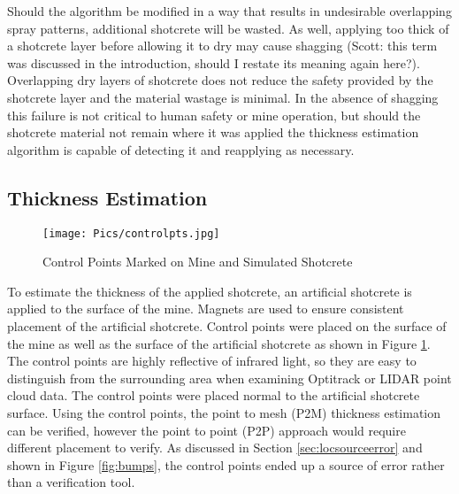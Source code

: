 Should the algorithm be modified in a way that results in undesirable overlapping spray patterns, additional shotcrete will be wasted. As well, applying too thick of a shotcrete layer before allowing it to dry may cause shagging (Scott: this term was discussed in the introduction, should I restate its meaning again here?). Overlapping dry layers of shotcrete does not reduce the safety provided by the shotcrete layer and the material wastage is minimal. In the absence of shagging this failure is not critical to human safety or mine operation, but should the shotcrete material not remain where it was applied the thickness estimation algorithm is capable of detecting it and reapplying as necessary.\\

\subsection{Thickness Estimation}

\begin{figure}
    \centering
    \texttt{[image: Pics/controlpts.jpg]}
    \caption{Control Points Marked on Mine and Simulated Shotcrete}
    \label{fig:controlpts}
\end{figure}

To estimate the thickness of the applied shotcrete, an artificial shotcrete is applied to the surface of the mine. Magnets are used to ensure consistent placement of the artificial shotcrete. Control points were placed on the surface of the mine as well as the surface of the artificial shotcrete as shown in Figure \ref{fig:controlpts}. The control points are highly reflective of infrared light, so they are easy to distinguish from the surrounding area when examining Optitrack or LIDAR point cloud data. The control points were placed normal to the artificial shotcrete surface. Using the control points, the point to mesh (P2M) thickness estimation can be verified, however the point to point (P2P) approach would require different placement to verify. As discussed in Section \ref{sec:locsourceerror} and shown in Figure \ref{fig:bumps}, the control points ended up a source of error rather than a verification tool.\\

